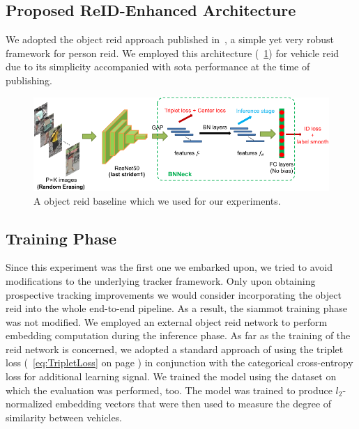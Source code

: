 \subsection{Proposed ReID-Enhanced Architecture}
\label{ssec:ProposedReIDEnhancedArchitecture}

We adopted the object \gls{reid} approach published in~\cite{luo2019bagoftricksreid}, a simple yet very robust framework for person \gls{reid}. We employed this architecture (\figtext{}~\ref{fig:BagOfTricksReIDArchitecture}) for vehicle \gls{reid} due to its simplicity accompanied with \gls{sota} performance at the time of publishing.

\begin{figure}[!t]
    \centering
    \includegraphics[width=\linewidth]{figures/siamese_tracking/bagoftricks_reid_architecture.pdf}
    \caption[Gls{reid} baseline]{A object \gls{reid} baseline which we used for our experiments. }
    \label{fig:BagOfTricksReIDArchitecture}
\end{figure}

\subsection{Training Phase}

Since this experiment was the first one we embarked upon, we tried to avoid modifications to the underlying tracker framework. Only upon obtaining prospective tracking improvements we would consider incorporating the object \gls{reid} into the whole end-to-end pipeline. As a result, the \gls{siammot} training phase was not modified. We employed an external object \gls{reid} network to perform embedding computation during the inference phase. As far as the training of the \gls{reid} network is concerned, we adopted a standard approach of using the triplet loss (\eqtext{}~\ref{eq:TripletLoss} on page \pageref{eq:TripletLoss}) in conjunction with the categorical cross-entropy loss for additional learning signal. We trained the model using the \verisss{} dataset on which the evaluation was performed, too. The model was trained to produce $l_2$-normalized embedding vectors that were then used to measure the degree of similarity between vehicles.


